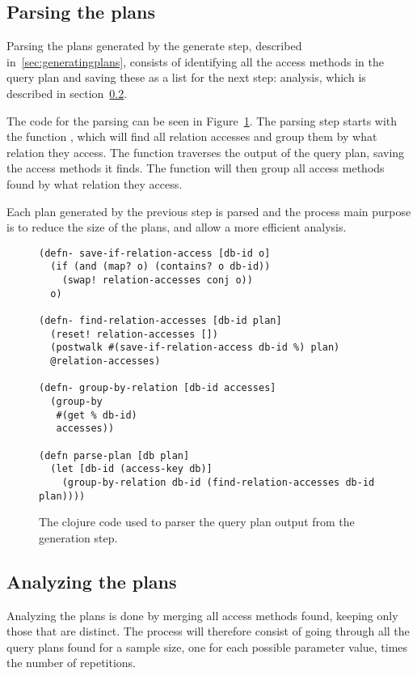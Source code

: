 \subsection{Parsing the plans}\label{sec:parsing}
Parsing the plans generated by the generate step, described
in~\ref{sec:generatingplans}, consists of identifying all the access
methods in the query plan and saving these as a list for the next step:
analysis, which is described in section~\ref{sec:analyzingplans}.

The code for the parsing can be seen in Figure~\ref{fig:clj:parsing}. The
parsing step starts with the function , which will find all
relation accesses and group them by what relation they access. The function
 traverses the output of the query plan, saving
the access methods it finds. The function  will then
group all access methods found by what relation they access.

Each plan generated by the previous step is parsed and the process main purpose
is to reduce the size of the plans, and allow a more efficient analysis.

\begin{figure}[ht]
\begin{verbatim}
(defn- save-if-relation-access [db-id o]
  (if (and (map? o) (contains? o db-id))
    (swap! relation-accesses conj o))
  o)

(defn- find-relation-accesses [db-id plan]
  (reset! relation-accesses [])
  (postwalk #(save-if-relation-access db-id %) plan)
  @relation-accesses)

(defn- group-by-relation [db-id accesses]
  (group-by
   #(get % db-id)
   accesses))

(defn parse-plan [db plan]
  (let [db-id (access-key db)]
    (group-by-relation db-id (find-relation-accesses db-id plan))))
   \end{verbatim}
   \caption[The clojure code to parse a query]{The clojure code used to parser
     the query plan output from the generation step.}
\label{fig:clj:parsing}
\end{figure}

\subsection{Analyzing the plans}\label{sec:analyzingplans}
Analyzing the plans is done by merging all access methods found, keeping only those
that are distinct. The process will therefore consist of going through all the
query plans found for a sample size, one for each possible parameter value,
times the number of repetitions.

